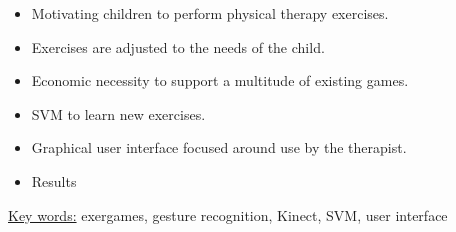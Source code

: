 \begin{itemize}
\item Motivating children to perform physical therapy exercises.
\item Exercises are adjusted to the needs of the child.
\item Economic necessity to support a multitude of existing games.
\item SVM to learn new exercises.
\item Graphical user interface focused around use by the therapist.
\item Results
\end{itemize}

\underline{Key words:} exergames, gesture recognition, Kinect, SVM, user interface